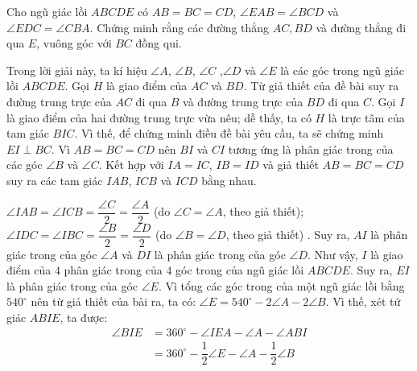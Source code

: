 \begin{bt}%
	Cho ngũ giác lồi $ABCDE$  có $AB=BC=CD$, $\angle EAB = \angle BCD $ và $\angle EDC= \angle CBA$. Chứng minh rằng các đường thẳng $AC,BD$ và đường thẳng đi qua $E$, vuông góc với $BC$ đồng qui. 
	\loigiai
	{
\immini
{Trong lời giải này, ta kí hiệu $\angle A$, $\angle B$, $\angle C$ ,$\angle D$ và $\angle E$ là các góc trong ngũ giác lồi $ABCDE$. Gọi $H$ là giao điểm của $AC$ và $BD$. 
		Từ giả thiết của đề bài suy ra đường trung trực của $AC$ đi qua $B$ và đường trung trực của $BD$ đi qua $C$. Gọi $I$ là giao điểm của hai đường trung trực vừa nêu; dễ thấy, ta có $H$ là trực tâm của tam giác $BIC$. Vì thế, để chứng minh điều đề bài yêu cầu, ta sẽ chứng minh $EI \perp BC$.
	Vì $AB=BC=CD$ nên $BI$ và $CI$ tương ứng là phân giác trong của các góc $\angle B$ và $\angle C$. Kết hợp với $IA=IC$, $IB=ID$ và giả thiết $AB=BC=CD$  suy ra các tam giác $IAB$, $ICB$ và $ICD$ bằng nhau.}
{
}
 $ \angle IAB = \angle ICB = \dfrac{\angle C}{2} = \dfrac{\angle A}{2} $
		(do $\angle C =\angle A$, theo giả thiết); \\
		$ \angle IDC =\angle IBC = \dfrac{\angle B}{2} = \dfrac{\angle D}{2} $
		(do $\angle B =\angle D$, theo giả thiết) . 
		Suy ra, $AI$ là phân giác trong của góc $\angle A$ và $DI$ là phân giác trong của góc $\angle D$. Như vậy, $I$ là giao điểm của $4$ phân giác trong của $4$ góc trong của ngũ giác lồi $ABCDE$. Suy ra, $EI$ là phân giác trong của góc $\angle E$. 
		Vì tổng các góc trong của một ngũ giác lồi bằng $540^\circ$ nên từ giả thiết của bài ra, ta có:  $\angle E =540^\circ -2\angle A -2\angle B.$
		Vì thế, xét tứ giác $ABIE$, ta được: 
		\begin{align*}
		\angle BIE& = 360^\circ - \angle IEA - \angle A -\angle ABI \\
		& = 360^\circ - \dfrac{1}{2}\angle E - \angle A -\dfrac{1}{2}\angle B \\

\end{align*}}
\end{bt}
